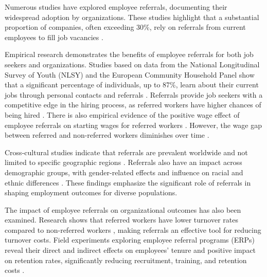 \documentclass[12pt]{article}
\begin{document}
Numerous studies have explored employee referrals, documenting their widespread adoption by organizations. These studies highlight that a substantial proportion of companies, often exceeding 30\%, rely on referrals from current employees to fill job vacancies \citep{holzer1987hiring, neckerman1991hiring, marsden2001social}.

Empirical research demonstrates the benefits of employee referrals for both job seekers and organizations. Studies based on data from the National Longitudinal Survey of Youth (NLSY) and the European Community Household Panel show that a significant percentage of individuals, up to 87\%, learn about their current jobs through personal contacts and referrals \citep{holzer1987job, pellizzari2010friends}. Referrals provide job seekers with a competitive edge in the hiring process, as referred workers have higher chances of being hired \citep{burks2015value}. There is also empirical evidence of the positive wage effect of employee referrals on starting wages for referred workers \citep{corcoran1980most, montgomery1991social, simon1992matchmaker, galenianos2013learning, brown2016informal, dustmann2016referral}. However, the wage gap between referred and non-referred workers diminishes over time \citep{simon1992matchmaker, galenianos2013learning, brown2016informal, dustmann2016referral}.

Cross-cultural studies indicate that referrals are prevalent worldwide and not limited to specific geographic regions \citep{alon1997job, wahba2005density, yakubovich2005weak}. Referrals also have an impact across demographic groups, with gender-related effects \citep{corcoran1980most, morrison1990women, lalanne2016old} and influence on racial and ethnic differences \cite{datcher1983impact, green1999racial, loury2006some}. These findings emphasize the significant role of referrals in shaping employment outcomes for diverse populations.

The impact of employee referrals on organizational outcomes has also been examined. Research shows that referred workers have lower turnover rates compared to non-referred workers \citep{simon1992matchmaker, dustmann2016referral, brown2016informal}, making referrals an effective tool for reducing turnover costs. Field experiments exploring employee referral programs (ERPs) reveal their direct and indirect effects on employees' tenure and positive impact on retention rates, significantly reducing recruitment, training, and retention costs \citep{friebel2023employee}.
\end{document}
